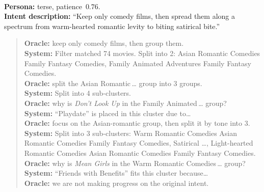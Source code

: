 \textbf{\\Persona:} terse, patience~$0.76$.
\\
\textbf{Intent description:} ``Keep only comedy films, then spread them along a spectrum
from warm-hearted romantic levity to biting satirical bite.''
\\
\begin{quote}\small
\textbf{Oracle:} keep only comedy films, then group them.\\
\textbf{System:} Filter matched 74 movies. Split into 2: \textsf{Asian Romantic Comedies Family
  Fantasy Comedies}, \textsf{Family Animated Adventures Family Fantasy Comedies}.\\
\textbf{Oracle:} split the \textsf{Asian Romantic\,\ldots} group into 3 groups.\\
\textbf{System:} Split into 4 sub-clusters.\\
\textbf{Oracle:} why is \emph{Don't Look Up} in the \textsf{Family Animated\,\ldots} group?\\
\textbf{System:} ``Playdate'' is placed in this cluster due to\ldots\\
\textbf{Oracle:} focus on the Asian-romantic group, then split it by tone into 3.\\
\textbf{System:} Split into 3 sub-clusters: \textsf{Warm Romantic Comedies Asian Romantic Comedies
  Family Fantasy Comedies}, \textsf{Satirical \ldots}, \textsf{Light-hearted Romantic Comedies Asian
  Romantic Comedies Family Fantasy Comedies}.\\
\textbf{Oracle:} why is \emph{Mean Girls} in the \textsf{Warm Romantic Comedies\,\ldots} group?\\
\textbf{System:} ``Friends with Benefits'' fits this cluster because\ldots\\
\textbf{Oracle:} we are not making progress on the original intent.
\end{quote}

\begin{table}[H]
  \centering
  \small
  \caption{Judge scores, failure session.}
  \label{tab:qual-failure-judge}
\end{table}

